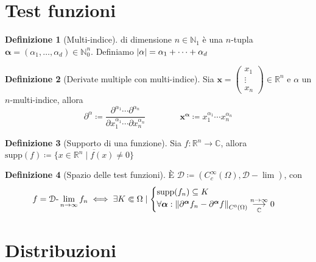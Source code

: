 \documentclass[a4paper,10pt]{article}
\theoremstyle{definition}
\newcommand{\bv}{\boldsymbol} %
\newcommand{\cvv}[3]{\begin{pmatrix} #1 \\ #2 \\ #3 \end{pmatrix}} %
\newcommand{\na}{\mathbb{N}} %
\newcommand{\re}{\mathbb{R}} %
\newcommand{\im}{\mathbb{C}} %
\newcommand{\supp}{\text{supp}} %
\newcommand{\llim}[2]{#2\text{-}\lim_{#1\to\infty}} %
\newcommand{\limm}[2]{\overunderset{#1\to\infty}{#2}{\longrightarrow}} %
\theoremstyle{indentdefinition}
\newtheorem{defn}{Definizione}[section]
\theoremstyle{indenttheorem}
\theoremstyle{myremark}
\theoremstyle{indentgeneral}
\begin{document}
\section{Test funzioni}
\begin{defn}[Multi-indice]
di dimensione $n\in\na_1$ è una $n$-tupla $\bv{\alpha}=(\alpha_1,\dots,\alpha_d)\in \na_0^n$. Definiamo $\abs{\alpha}=\alpha_1+\dots+\alpha_d$
\end{defn}
\begin{defn}[Derivate multiple con multi-indice] Sia $\bv{x}=\cvv{x_1}{\vdots}{x_n}\in\re^n$ e $\alpha$ un $n$-multi-indice, allora
$$\partial^\alpha\coloneqq\frac{\partial^{\alpha_1}\cdots\partial^{\alpha_n}}{\partial x_1^{\alpha_1}\cdots\partial x_n^{\alpha_n}}\qquad\qquad \bv{x}^{\bv{\alpha}}\coloneqq x_1^{\alpha_1}\cdots x_n^{\alpha_n}$$
\end{defn}

\begin{defn}[Supporto di una funzione]
    Sia $f:\re^n\to\im$, allora $\text{supp}(f)\coloneqq\overline{\{x\in\re^n\mid f(x)\ne0\}}$
\end{defn}
\begin{defn}[Spazio delle test funzioni]
    È $\mathcal{D}\coloneqq(C_c^\infty(\Omega),\mathcal{D-}\lim)$, con $$f=\llim{n}{\mathcal{D}}f_n\iff\exists K\Subset \Omega\mid 
    \begin{cases}
        \supp(f_n)\subseteq K\\
        \forall\bv{\alpha}:\norm{\partial^{\bv{\alpha}}f_n-\partial^{\bv{\alpha}}f}_{C^0(\Omega)}\limm{n}{\im}0
    \end{cases}$$
\end{defn}

\section{Distribuzioni}
\end{document}
